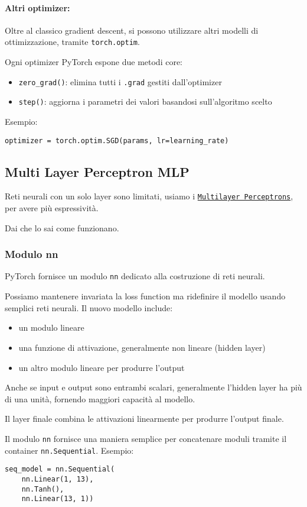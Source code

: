 \paragraph{Altri optimizer:} Oltre al classico gradient descent, si possono utilizzare altri modelli di ottimizzazione, tramite \texttt{torch.optim}.

Ogni optimizer PyTorch espone due metodi core: 
\begin{itemize}
    \item \texttt{zero\_grad()}: elimina tutti i \texttt{.grad} gestiti dall'optimizer
    
    \item \texttt{step()}: aggiorna i parametri dei valori basandosi sull'algoritmo scelto
\end{itemize}

Esempio: 
\begin{verbatim}
optimizer = torch.optim.SGD(params, lr=learning_rate)
\end{verbatim}

\subsection{Multi Layer Perceptron MLP}

Reti neurali con un solo layer sono limitati, usiamo i \href{https://it.wikipedia.org/wiki/Percettrone_multistrato}{\texttt{Multilayer Perceptrons}}, per avere più espressività.

Dai che lo sai come funzionano.

\subsubsection{Modulo nn}

PyTorch fornisce un modulo \texttt{nn} dedicato alla costruzione di reti neurali.

Possiamo mantenere invariata la loss function ma ridefinire il modello usando semplici reti neurali. Il nuovo modello include: 
\begin{itemize}
    \item un modulo lineare
    
    \item una funzione di attivazione, generalmente non lineare (hidden layer)
    
    \item un altro modulo lineare per produrre l'output
\end{itemize}

Anche se input e output sono entrambi scalari, generalmente l'hidden layer ha più di una unità, fornendo maggiori capacità al modello.

Il layer finale combina le attivazioni linearmente per produrre l'output finale.

Il modulo \texttt{nn} fornisce una maniera semplice per concatenare moduli tramite il container \texttt{nn.Sequential}. Esempio: 
\begin{verbatim}
seq_model = nn.Sequential(
    nn.Linear(1, 13),
    nn.Tanh(),
    nn.Linear(13, 1))
\end{verbatim}

